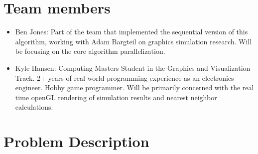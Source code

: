 \documentclass[cameraready]{acmsiggraph-awb}
\title{\theTitle}
\author{
	Ben Jones \and Kyle Hansen}
\begin{document}

\maketitle




\section{Team members}

\begin{itemize}

\item Ben Jones: Part of the team that implemented the sequential version of this algorithm, working with Adam Bargteil on graphics simulation research.
Will be focusing on the core algorithm parallelization.

\item Kyle Hansen: Computing Masters Student in the Graphics and Visualization Track.  
2+ years of real world programming experience as an electronics engineer.  
Hobby game programmer.  
Will be primarily concerned with the real time openGL rendering of simulation results and nearest neighbor calculations.

\end{itemize}

\section{Problem Description}
\end{document}
